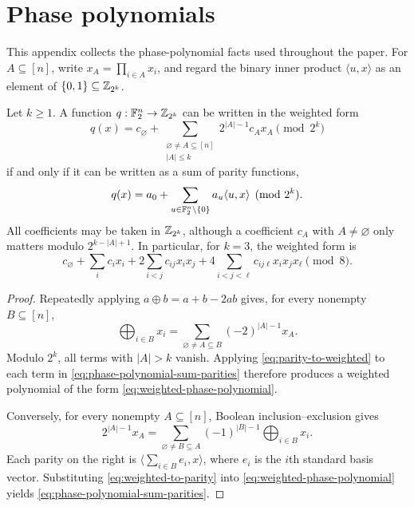 \section{Phase polynomials}\label{app:phase-polynomials}

This appendix collects the phase-polynomial facts used throughout the paper.
For $A\subseteq [n]$, write $x_A=\prod_{i\in A}x_i$, and regard the
binary inner product $\langle u,x\rangle$ as an element of
\(\{0,1\}\subseteq\mathbb{Z}_{2^k}\).

\begin{theorem}
    \label{thm:phase-polynomial-equivalence}
    Let $k\geq 1$.  A function $q:\mathbb{F}_2^n\to\mathbb{Z}_{2^k}$ can be written in
    the weighted form
    \begin{equation}
        \label{eq:weighted-phase-polynomial}
        q(x)=c_\varnothing+
        \sum_{\substack{\varnothing\neq A\subseteq[n]\\ |A|\leq k}}
        2^{|A|-1}c_Ax_A
        \pmod {2^k}
    \end{equation}
    if and only if it can be written as a sum of parity functions,
    \begin{equation}
        \label{eq:phase-polynomial-sum-parities}
        q(x)=a_0+
        \sum_{u\in\F_2^n\setminus\{0\}}a_u\langle u,x\rangle
        \pmod {2^k}.
    \end{equation}
    All coefficients may be taken in \(\mathbb{Z}_{2^k}\), although a coefficient
    $c_A$ with $A\neq\varnothing$ only matters modulo
    $2^{k-|A|+1}$.  In particular, for $k=3$, the weighted form is
    \[
        c_\varnothing+\sum_i c_i x_i
        +2\sum_{i<j}c_{ij}x_ix_j
        +4\sum_{i<j<\ell}c_{ij\ell}x_ix_jx_\ell
        \pmod 8.
    \]
\end{theorem}

\begin{proof}
    Repeatedly applying $a\oplus b=a+b-2ab$ gives, for every nonempty
    $B\subseteq[n]$,
    \begin{equation}
        \label{eq:parity-to-weighted}
        \bigoplus_{i\in B}x_i
        =\sum_{\varnothing\neq A\subseteq B}
        (-2)^{|A|-1}x_A.
    \end{equation}
    Modulo $2^k$, all terms with $|A|>k$ vanish.  Applying
    \cref{eq:parity-to-weighted} to each term in
    \cref{eq:phase-polynomial-sum-parities} therefore produces a weighted
    polynomial of the form \eqref{eq:weighted-phase-polynomial}.

    Conversely, for every nonempty $A\subseteq[n]$, Boolean
    inclusion--exclusion gives
    \begin{equation}
        \label{eq:weighted-to-parity}
        2^{|A|-1}x_A
        =\sum_{\varnothing\neq B\subseteq A}
        (-1)^{|B|-1}
        \bigoplus_{i\in B}x_i.
    \end{equation}
    Each parity on the right is
    $\langle \sum_{i\in B}e_i,x\rangle$, where $e_i$ is the $i$th
    standard basis vector.  Substituting \cref{eq:weighted-to-parity} into
    \cref{eq:weighted-phase-polynomial} yields
    \cref{eq:phase-polynomial-sum-parities}.
\end{proof}

